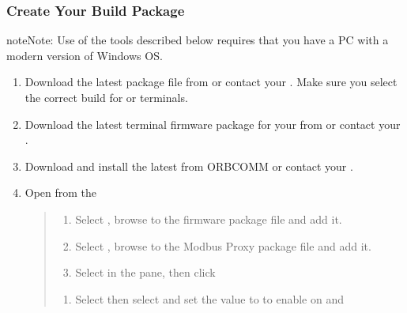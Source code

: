 \documentclass[letterpaper,10pt,english]{sphinxmanual}
\begin{document}
\subsubsection{Create Your Build Package}
\label{\detokenize{usage:create-your-build-package}}\label{\detokenize{usage:solution-studio-package}}
\begin{sphinxadmonition}{note}{Note:}
Use of the tools described below requires that you have a PC with a modern version of Windows OS.
\end{sphinxadmonition}
\begin{enumerate}
\item {} 
Download the latest  package file from  or contact your .  Make sure you select the correct build for  or  terminals.

\item {} 
Download the latest terminal firmware package for your  from  or contact your .

\item {} 
Download and install the latest  from ORBCOMM or contact your .

\item {} 
Open  from the 
\begin{quote}
\begin{enumerate}
\item {} 
Select , browse to the firmware package file and add it.

\item {} 
Select , browse to the Modbus Proxy package file and add it.

\item {} 
Select  in the  pane, then click 

\end{enumerate}
\label{\detokenize{usage:changedefaultmsgbitmap}}\begin{enumerate}
\item {} 
Select  then select  and set the value to  to enable  on  and 


\end{enumerate}
\end{quote}
\end{enumerate}
\end{document}

